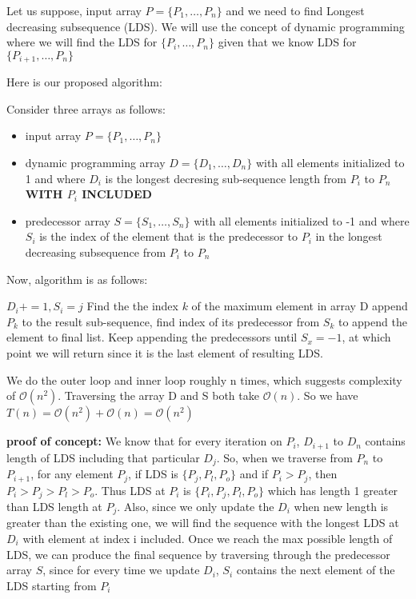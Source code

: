 \documentclass[11pt]{article}
\renewcommand{\O}{\mathcal{O}}
\begin{document}
Let us suppose, input array $P = \{P_1, \dots, P_n\}$ and we need to find Longest decreasing subsequence (LDS). 
We will use the concept of dynamic programming where we will find the LDS for $\{P_i, \dots, P_n\}$ 
given that we know LDS for $\{P_{i+1}, \dots, P_n\}$

\noindent Here is our proposed algorithm:


\noindent Consider three arrays as follows:

\begin{itemize}
\item input array $P = \{P_1, \dots, P_n\}$
\item dynamic programming array $D = \{D_1, \dots, D_n\}$ with all elements initialized to 1 and
where $D_i$ is the longest decresing sub-sequence length from $P_i$ to $P_n$ {\bf WITH $P_i$ INCLUDED}
\item predecessor array $S = \{S_1, \dots, S_n\}$  with all elements initialized to -1 and
where $S_i$ is the index of the element that is the predecessor to $P_i$ in the longest
decreasing subsequence from $P_i$ to $P_n$
\end{itemize}

\noindent Now, algorithm is as follows:

\begin{algorithm}
\begin{algorithmic}
        \State$D_i += 1, S_i = j$
      \EndIf
    \EndFor
  \EndFor
  \State Find the the index $k$ of the maximum element in array D
  \State append $P_k$ to the result sub-sequence, find index of its predecessor from $S_k$ to append the element to final list. Keep appending the predecessors until $S_x = -1$, at which point we will return since it is the last element of resulting LDS.
\end{algorithmic}
\end{algorithm}

 We do the outer loop and inner loop roughly n times, which suggests complexity of $\O(n^2)$. Traversing the array D and S both take $\O(n)$. So we have $T(n) = \O(n^2) + \O(n) = \O(n^2)$


{\bf proof of concept:}
We know that for every iteration on $P_i$, $D_{i+1}$ to $D_n$ contains length of LDS including that particular $D_j$.
So, when we traverse from $P_n$ to $P_{i+1}$, for any element $P_j$, if LDS is $\{P_j, P_l, P_o\}$ and if $P_i > P_j$, then $P_i > P_j > P_l > P_o$.
Thus LDS at $P_i$ is $\{P_i, P_j, P_l, P_o\}$ which has length 1 greater than LDS length at $P_j$. 
Also, since we only update the $D_i$ when new length is greater than the existing one, we will find the sequence with the longest LDS at $D_i$ with element at index i included.
Once we reach the max possible length of LDS, we can produce the final sequence by traversing through the predecessor array $S$, since for every time we update $D_i$, $S_i$ contains the next element of the LDS starting from $P_i$
 
\end{document}
